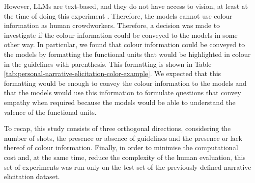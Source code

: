 
However, LLMs are text-based, and they do not have access to vision, at least at the time of doing this experiment \cite{chatgpt-see}. Therefore, the models cannot use colour information as human crowdworkers. Therefore, a decision was made to investigate if the colour information could be conveyed to the models in some other way. In particular, we found that colour information could be conveyed to the models by formatting the functional units that would be highlighted in colour in the guidelines with parenthesis. This formatting is shown in Table \ref{tab:personal-narrative-elicitation-color-example}. We expected that this formatting would be enough to convey the colour information to the models and that the models would use this information to formulate questions that convey empathy when required because the models would be able to understand the valence of the functional units. 

% 
To recap, this study consists of three orthogonal directions, considering the number of shots, the presence or absence of guidelines and the presence or lack thereof of colour information. 
Finally, in order to minimise the computational cost and, at the same time, reduce the complexity of the human evaluation, this set of experiments was run only on the test set of the previously defined narrative elicitation dataset. 
